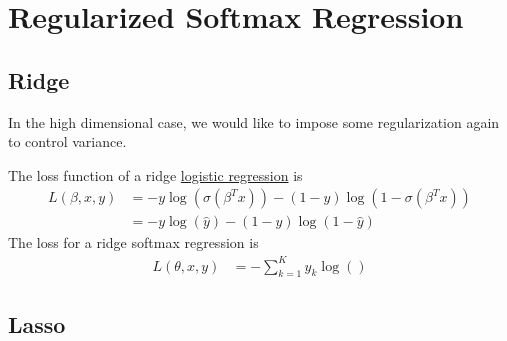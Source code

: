 \section{Regularized Softmax Regression} 

\subsection{Ridge} 

  In the high dimensional case, we would like to impose some regularization again to control variance. 

  \begin{definition}[Loss]
    \label{def:loss}
    The loss function of a ridge \hyperref[def:logistic-regression]{logistic regression} is 
    \begin{align}
      L(\beta, x, y) & = - y \log(\sigma(\beta^T x)) - (1 - y) \log(1 - \sigma(\beta^T x)) \\ 
                     & = -y \log(\hat{y}) - (1 - y) \log (1 - \hat{y})
    \end{align}
    The loss for a ridge softmax regression is 
    \begin{align}
      L(\theta, x, y) & = - \sum_{k=1}^K y_k \log ()
    \end{align}
  \end{definition}

\subsection{Lasso} 

